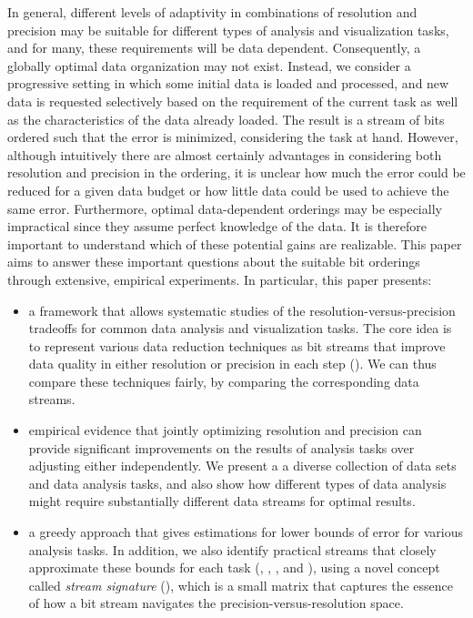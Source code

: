 In general, different levels of adaptivity in combinations of resolution and precision may be
suitable for different types of analysis and visualization tasks, and for many, these requirements
will be data dependent. Consequently, a globally optimal data organization may not exist. Instead,
we consider a progressive setting in which some initial data is loaded and processed, and new data
is requested selectively based on the requirement of the current task as well as the characteristics
of the data already loaded. The result is a stream of bits ordered such that the error is minimized,
considering the task at hand. However, although intuitively there are almost certainly advantages in
considering both resolution and precision in the ordering, it is unclear how much the error could be
reduced for a given data budget or how little data could be used to achieve the same error.
Furthermore, optimal data-dependent orderings may be especially impractical since they assume
perfect knowledge of the data. It is therefore important to understand which of these potential
gains are realizable. This paper aims to answer these important questions about the suitable bit
orderings through extensive, empirical experiments. In particular, this paper presents:

\begin{itemize}\dense
%
\item a framework that allows systematic studies of the resolution-versus-precision tradeoffs for
common data analysis and visualization tasks. The core idea is to represent various data reduction
techniques as bit streams that improve data quality in either resolution or precision in each step
(). We can thus compare these techniques fairly, by comparing the
corresponding data streams.
%  
\item empirical evidence that jointly optimizing resolution and precision can provide significant
improvements on the results of analysis tasks over adjusting either independently. 
We present a a diverse collection of data sets and data analysis tasks, and also show how
different types of data analysis might require substantially different data streams for optimal
results.
%
\item a greedy approach that gives estimations for lower bounds of error for various analysis tasks.
In addition, we also identify practical streams that closely approximate these bounds for each task
(, , , and
), using a novel concept called \emph{stream signature}
(), which is a small matrix that captures the essence of how a bit stream
navigates the precision-versus-resolution space.
\end{itemize}



